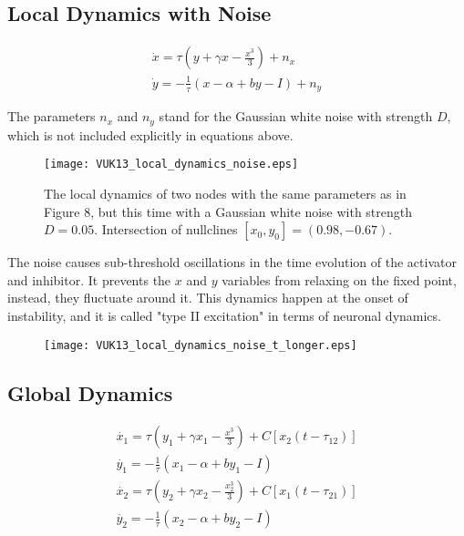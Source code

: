\documentclass[12pt]{article}
\begin{document}
\subsection{Local Dynamics with Noise}
\begin{subequations}
 \begin{align}\dot{x} = \tau (y + \gamma x - \frac{x^3}{3}) +n_x  \label{eqn: frobenius 17}\\  \dot{y} = -\frac{1}{\tau} (x - \alpha + b y - I ) + n_y \label{eqn: frobenius 18}   \end{align} 
\end{subequations}

The parameters $n_x$ and $n_y$ stand for the Gaussian white noise with strength $D$, which is not included explicitly in equations above.


\begin{figure}[h!]
	\centering
	\texttt{[image: VUK13\_local\_dynamics\_noise.eps]}
		\caption{The local dynamics of two nodes with the same parameters as in Figure 8, but this time with a Gaussian white noise with strength $D = 0.05$. Intersection of nullclines $[x_0, y_0] = (0.98,  -0.67)$. }
\end{figure}

The noise causes sub-threshold oscillations in the time evolution of the activator and inhibitor. It prevents the $x$ and $y$ variables from relaxing on the fixed point, instead, they fluctuate around it. This dynamics happen at the onset of instability, and it is called "type II excitation" in terms of neuronal dynamics.

\begin{figure}[h!]
	\centering
	\texttt{[image: VUK13\_local\_dynamics\_noise\_t\_longer.eps]}
		\caption{ }
\end{figure}

\newpage

\subsection{Global Dynamics}

\begin{subequations}
 \begin{align}\dot{x_1} = \tau (y_1 + \gamma x_1 - \frac{x^3}{3}) + C [x_2(t-\tau_{12})]  \label{eqn: frobenius 17}\\  \dot{y_1} = -\frac{1}{\tau} (x_1 - \alpha + b y_1 - I ) \label{eqn: frobenius 18} \\ \dot{x_2} = \tau (y_2 + \gamma x_2 - \frac{x_2^3}{3}) + C [x_1(t-\tau_{21})] \label{eqn: frobenius 18} \\  \dot{y_2} = -\frac{1}{\tau} (x_2 - \alpha + b y_2 - I ) \end{align} 
\end{subequations}
\end{document}
